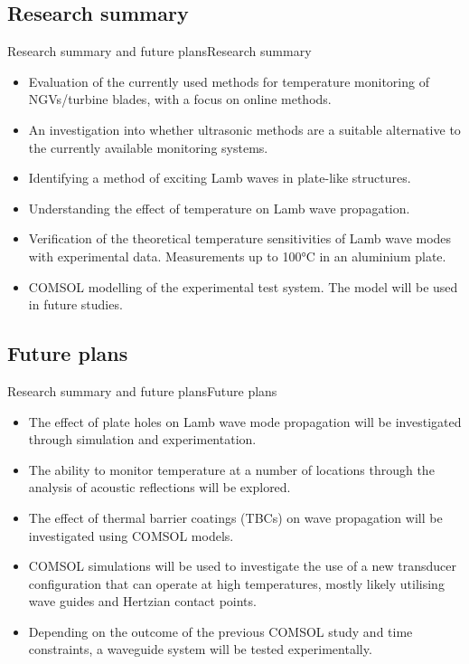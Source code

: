 \documentclass[aspectratio=169, 9pt]{beamer}
\begin{document}
\subsection{Research summary}
\begin{frame}{Research summary and future plans}{Research summary}
  \begin{itemize}
    \item Evaluation of the currently used methods for temperature monitoring of NGVs/turbine blades, with a focus on online methods.
    \item An investigation into whether ultrasonic methods are a suitable alternative to the currently available monitoring systems.
    \item Identifying a method of exciting Lamb waves in plate-like structures.
    \item Understanding the effect of temperature on Lamb wave propagation.
    \item Verification of the theoretical temperature sensitivities of Lamb wave modes with experimental data. Measurements up to 100\si{\degreeCelsius} in an aluminium plate.
    \item COMSOL modelling of the experimental test system. The model will be used in future studies.
\end{itemize} 
\end{frame}


\subsection{Future plans}
\begin{frame}{Research summary and future plans}{Future plans}
  \begin{itemize}
    \item The effect of plate holes on Lamb wave mode propagation will be investigated through simulation and experimentation.
    \item The ability to monitor temperature at a number of locations through the analysis of acoustic reflections will be explored.
    \item The effect of thermal barrier coatings (TBCs) on wave propagation will be investigated using COMSOL models.
    \item COMSOL simulations will be used to investigate the use of a new transducer configuration that can operate at high temperatures, mostly likely utilising wave guides and Hertzian contact points.
    \item Depending on the outcome of the previous COMSOL study and time constraints, a waveguide system will be tested experimentally.
\end{itemize}
\end{frame}
\end{document}
